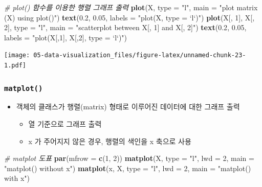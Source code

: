 \documentclass[
  11pt,
]{krantz}
\newenvironment{Shaded}{\begin{snugshade}}{\end{snugshade}}
\newcommand{\CommentTok}[1]{\textcolor[rgb]{0.37,0.37,0.37}{\textit{#1}}}
\newcommand{\DataTypeTok}[1]{\textcolor[rgb]{0.27,0.27,0.27}{#1}}
\newcommand{\DecValTok}[1]{\textcolor[rgb]{0.06,0.06,0.06}{#1}}
\newcommand{\FloatTok}[1]{\textcolor[rgb]{0.06,0.06,0.06}{#1}}
\newcommand{\KeywordTok}[1]{\textcolor[rgb]{0.27,0.27,0.27}{\textbf{#1}}}
\newcommand{\NormalTok}[1]{#1}
\newcommand{\StringTok}[1]{\textcolor[rgb]{0.5,0.5,0.5}{#1}}
\providecommand{\tightlist}{%
  \setlength{\itemsep}{0pt}\setlength{\parskip}{0pt}}
\begin{document}
\begin{Shaded}
\begin{Highlighting}[]
\CommentTok{# plot() 함수를 이용한 행렬 그래프 출력}
\KeywordTok{plot}\NormalTok{(X, }\DataTypeTok{type =} \StringTok{"l"}\NormalTok{, }\DataTypeTok{main =} \StringTok{"plot matrix (X) using plot()"}\NormalTok{)}
\KeywordTok{text}\NormalTok{(}\FloatTok{0.2}\NormalTok{, }\FloatTok{0.05}\NormalTok{, }\DataTypeTok{labels =} \StringTok{"plot(X, type = `l`)"}\NormalTok{)}
\KeywordTok{plot}\NormalTok{(X[, }\DecValTok{1}\NormalTok{], X[, }\DecValTok{2}\NormalTok{], }\DataTypeTok{type =} \StringTok{"l"}\NormalTok{, }
     \DataTypeTok{main =} \StringTok{"scatterplot between X[, 1] and X[, 2]"}\NormalTok{)}
\KeywordTok{text}\NormalTok{(}\FloatTok{0.2}\NormalTok{, }\FloatTok{0.05}\NormalTok{, }\DataTypeTok{labels =} \StringTok{"plot(X[,1], X[,2], type = `l`)"}\NormalTok{)}
\end{Highlighting}
\end{Shaded}

\texttt{[image: 05-data-visualization\_files/figure-latex/unnamed-chunk-23-1.pdf]}

\normalsize

\hypertarget{mat_plot}{%
\subsubsection*{\texorpdfstring{\textbf{\texttt{matplot()}}}{matplot()}}\label{mat_plot}}


\begin{itemize}
\tightlist
\item
  객체의 클래스가 행렬(matrix) 형태로 이루어진 데이터에 대한 그래프 출력

  \begin{itemize}
  \tightlist
  \item
    열 기준으로 그래프 출력
  \item
    x 가 주어지지 않은 경우, 행렬의 색인을 x 축으로 사용
  \end{itemize}
\end{itemize}

\footnotesize

\begin{Shaded}
\begin{Highlighting}[]
\CommentTok{# matplot 도표}
\KeywordTok{par}\NormalTok{(}\DataTypeTok{mfrow =} \KeywordTok{c}\NormalTok{(}\DecValTok{1}\NormalTok{, }\DecValTok{2}\NormalTok{))}
\KeywordTok{matplot}\NormalTok{(X, }\DataTypeTok{type =} \StringTok{"l"}\NormalTok{, }
        \DataTypeTok{lwd =} \DecValTok{2}\NormalTok{, }
        \DataTypeTok{main =} \StringTok{"matplot() without x"}\NormalTok{)}
\KeywordTok{matplot}\NormalTok{(x, X, }\DataTypeTok{type =} \StringTok{"l"}\NormalTok{, }
        \DataTypeTok{lwd =} \DecValTok{2}\NormalTok{, }
        \DataTypeTok{main =} \StringTok{"matplot() with x"}\NormalTok{)}
\end{Highlighting}
\end{Shaded}
\end{document}
